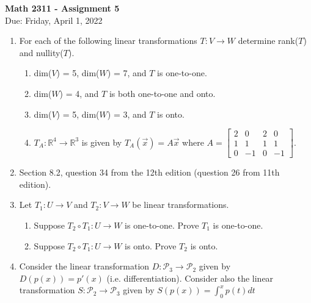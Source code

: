 \documentclass[12pt]{article}
\newcommand {\DS} [1] {${\displaystyle #1}$}
\begin{document}
\thispagestyle{empty}

\begin{center}
\textbf{Math 2311  - Assignment 5}\\
Due: Friday, April 1, 2022
\end{center}


\begin{enumerate}


\item For each of the following linear transformations $T: V \to W$ determine rank($T$) and nullity($T$).
\begin{enumerate}
\item dim($V$) = 5, dim($W$) = 7, and $T$ is one-to-one.
\item dim($W$) = 4, and $T$ is both one-to-one and onto.
\item dim($V$) = 5, dim($W$) = 3, and $T$ is onto.
\item $T_A: \mathbb{R}^4 \to \mathbb{R}^3$ is given by $T_A(\vec{x}) = A\vec{x}$ where \DS{A = \begin{bmatrix}
2 & 0 & 2 & 0 \\
1 & 1 & 1& 1 \\
0 & -1 & 0 & -1
\end{bmatrix}}. 
\end{enumerate}

\item Section 8.2, question 34 from the 12th edition (question 26 from 11th edition).

\item Let $T_1: U \to V$ and $T_2: V \to W$ be linear transformations.
\begin{enumerate}
\item Suppose $T_2 \circ T_1: U \to W$ is one-to-one. Prove $T_1$ is one-to-one.
\item Suppose $T_2 \circ T_1: U \to W$ is onto. Prove $T_2$ is onto.
\end{enumerate}

\item Consider the linear transformation $D: \mathcal{P}_3 \to \mathcal{P}_2$ given by $D(p(x)) = p'(x)$ (i.e. differentiation). Consider also the linear transformation $S: \mathcal{P}_2 \to \mathcal{P}_3$ given by \DS{S(p(x)) = \int_0^x p(t)dt}


\end{enumerate}
\end{document}

